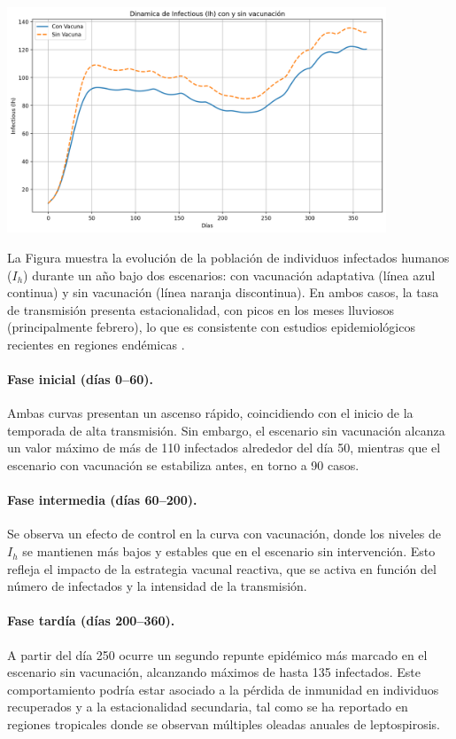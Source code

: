 \documentclass[12pt,a4paper]{article}
\begin{document}
\includegraphics[width=0.85\textwidth]{Images/infectados.png}

La Figura  muestra la evolución de la población de individuos infectados humanos ($I_h$) durante un año bajo dos escenarios: con vacunación adaptativa (línea azul continua) y sin vacunación (línea naranja discontinua). En ambos casos, la tasa de transmisión presenta estacionalidad, con picos en los meses lluviosos (principalmente febrero), lo que es consistente con estudios epidemiológicos recientes en regiones endémicas \cite{pijnacker2019}.

\paragraph{Fase inicial (días 0–60).} Ambas curvas presentan un ascenso rápido, coincidiendo con el inicio de la temporada de alta transmisión. Sin embargo, el escenario sin vacunación alcanza un valor máximo de más de 110 infectados alrededor del día 50, mientras que el escenario con vacunación se estabiliza antes, en torno a 90 casos.

\paragraph{Fase intermedia (días 60–200).} Se observa un efecto de control en la curva con vacunación, donde los niveles de $I_h$ se mantienen más bajos y estables que en el escenario sin intervención. Esto refleja el impacto de la estrategia vacunal reactiva, que se activa en función del número de infectados y la intensidad de la transmisión.

\paragraph{Fase tardía (días 200–360).} A partir del día 250 ocurre un segundo repunte epidémico más marcado en el escenario sin vacunación, alcanzando máximos de hasta 135 infectados. Este comportamiento podría estar asociado a la pérdida de inmunidad en individuos recuperados y a la estacionalidad secundaria, tal como se ha reportado en regiones tropicales donde se observan múltiples oleadas anuales de leptospirosis.
\end{document}
